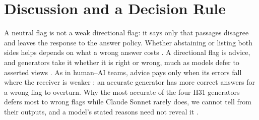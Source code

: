 \section{Discussion and a Decision Rule}
\label{sec:discussion}

A neutral flag is not a weak directional flag: it says only that passages disagree and leaves the response to the
answer policy. Whether abstaining or listing both sides helps depends on what a wrong answer costs
\citep{wen2025abstention}. A directional flag is advice, and generators take it whether it is right or wrong, much
as models defer to asserted views \citep{sharma2024sycophancy}. As in human--AI teams, advice pays only when its
errors fall where the receiver is weaker \citep{bansal2021accurate,mozannar2020defer}: an accurate generator has
more correct answers for a wrong flag to overturn. Why the most accurate of the four H31 generators defers most to
wrong flags while Claude Sonnet rarely does, we cannot tell from their outputs, and a model's stated reasons need not
reveal it \citep{chen2025reasoning}.

